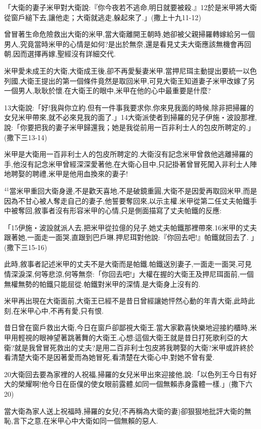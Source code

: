 \documentclass{book}
\begin{document}
「大衛的妻子米甲對大衛說:『你今夜若不逃命,明日就要被殺.』12於是米甲將大衛從窗戶縋下去,讓他走；大衛就逃走,躲起來了.」(撒上十九11-12)

曾冒著生命危險救出大衛的米甲,當大衛離開王朝時,她卻被父親掃羅轉嫁給另一個男人,究竟當時米甲的心情是如何?是出於無奈,還是看見丈夫大衛應該無機會再回朝,因而選擇再嫁,聖經沒有詳細交代.

米甲愛未成王的大衛,大衛成王後,卻不再愛髮妻米甲.當押尼珥主動提出要統一以色列國,大衛王提出的第一個條件竟然是取回米甲,可見大衛王知道妻子米甲改嫁了另一個男人,耿耿於懷.在大衛王的眼中,米甲在他的心中最重要是什麼?

13大衛說:「好!我與你立約.但有一件事我要求你,你來見我面的時候,除非把掃羅的女兒米甲帶來,就不必來見我的面了.」14大衛派使者到掃羅的兒子伊施‧波設那裡,說:「你要把我的妻子米甲歸還我；她是我從前用一百非利士人的包皮所聘定的.」(撒下三13-14)

米甲是大衛用一百非利士人的包皮所聘定的.大衛沒有記念米甲曾救他逃離掃羅的手,他沒有記念米甲曾經深深愛著他,在大衛心目中,只記掛著曾冒死闖入非利士人陣地聘娶的聘禮,米甲是他用血換來的妻子!

$^{41}$當米甲重回大衛身邊,不是歡天喜地,不是破鏡重圓,大衛不是因愛再取回米甲,而是因為不甘心被人奪走自己的妻子,他誓要奪回來,以示主權.米甲從第二任丈夫帕鐵手中被奪回,敘事者沒有形容米甲的心情,只是側面描寫了丈夫帕鐵的反應:

「15伊施‧波設就派人去,把米甲從拉億的兒子,她丈夫帕鐵那裡帶來.16米甲的丈夫跟著她,一面走一面哭,直跟到巴戶琳.押尼珥對他說:『你回去吧!』帕鐵就回去了. 」(撒下三15-16)

此時,敘事者記述米甲的丈夫不是大衛而是帕鐵.帕鐵送別妻子,一面走一面哭,可見情深淚深,何等悲涼,何等無奈:「你回去吧!」大權在握的大衛王及押尼珥面前,一個無權無勢的帕鐵只能屈從.帕鐵對米甲的深情,是大衛身上沒有的.

米甲再出現在大衛面前,大衛王已經不是昔日曾經讓她怦然心動的年青大衛,此時此刻,在米甲心中,不再有愛,只有恨.

昔日曾在窗戶救出大衛,今日在窗戶卻鄙視大衛王.當大家歡喜快樂地迎接約櫃時,米甲用輕視的眼神望著跳著舞的大衛王.心想:這個大衛王就是昔日打死歌利亞的大衛?就是我曾冒死救出的丈夫?是用二百非利士包皮將我聘娶的大衛?米甲或許終於看清楚大衛不是因著愛而為她冒死,看清楚在大衛心中,對她不曾有愛.

20大衛回去要為家裡的人祝福,掃羅的女兒米甲出來迎接他,說:「以色列王今日有好大的榮耀啊!他今日在臣僕的使女眼前露體,如同一個無賴赤身露體一樣.」(撒下六20)

當大衛為家人送上祝福時,掃羅的女兒(不再稱為大衛的妻)卻狠狠地批評大衛的無恥,言下之意,在米甲心中大衛如同一個無賴的惡人.
\end{document}

